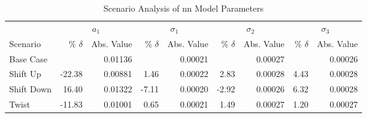 \begin{table}[H]
	\centering
	\setlength{\tabcolsep}{5pt}
	\caption{Scenario Analysis of \ac{nn} Model Parameters}
	\label{tab:scenario_analysis_part_nn}
	\begin{threeparttable}
		\begin{tabular}{l *{4}{rr}}
			\toprule
			           & \multicolumn{2}{c}{$a_1$} & \multicolumn{2}{c}{$\sigma_1$} & \multicolumn{2}{c}{$\sigma_2$} & \multicolumn{2}{c}{$\sigma_3$}                                                       \\
			\cmidrule(lr){2-3} \cmidrule(lr){4-5} \cmidrule(lr){6-7} \cmidrule(lr){8-9}
			Scenario   & \% $\delta$               & Abs. Value                     & \% $\delta$                    & Abs. Value                     & \% $\delta$ & Abs. Value & \% $\delta$ & Abs. Value \\
			\midrule

			Base Case  &                           & 0.01136                        &                                & 0.00021                        &             & 0.00027    &             & 0.00026    \\
			Shift Up   & -22.38                    & 0.00881                        & 1.46                           & 0.00022                        & 2.83        & 0.00028    & 4.43        & 0.00028    \\
			Shift Down & 16.40                     & 0.01322                        & -7.11                          & 0.00020                        & -2.92       & 0.00026    & 6.32        & 0.00028    \\
			Twist      & -11.83                    & 0.01001                        & 0.65                           & 0.00021                        & 1.49        & 0.00027    & 1.20        & 0.00027    \\
			\bottomrule
		\end{tabular}
	\end{threeparttable}
\end{table}

